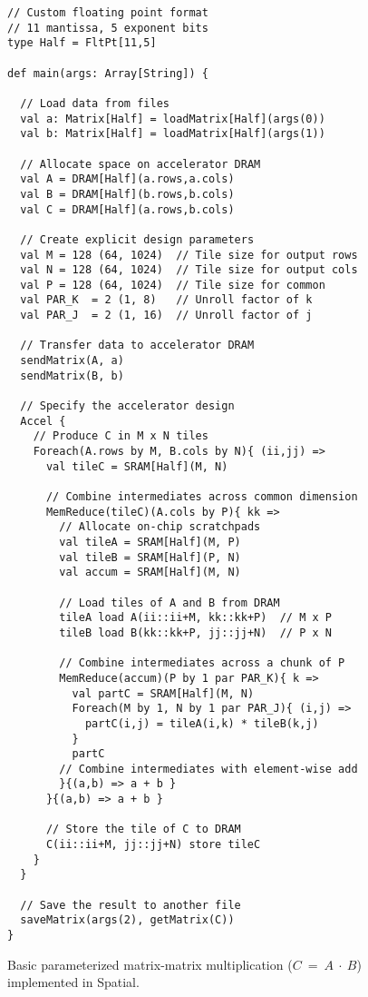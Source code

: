 \begin{figure}
\centering

\newsavebox{\gemm}
\begin{lrbox}{\gemm}
\begin{lstlisting}[language=Spatial,linewidth=0.88\columnwidth]
// Custom floating point format
// 11 mantissa, 5 exponent bits
type Half = FltPt[11,5]

def main(args: Array[String]) {

  // Load data from files
  val a: Matrix[Half] = loadMatrix[Half](args(0))
  val b: Matrix[Half] = loadMatrix[Half](args(1))

  // Allocate space on accelerator DRAM
  val A = DRAM[Half](a.rows,a.cols)
  val B = DRAM[Half](b.rows,b.cols)
  val C = DRAM[Half](a.rows,b.cols)

  // Create explicit design parameters
  val M = 128 (64, 1024)  // Tile size for output rows
  val N = 128 (64, 1024)  // Tile size for output cols
  val P = 128 (64, 1024)  // Tile size for common
  val PAR_K  = 2 (1, 8)   // Unroll factor of k
  val PAR_J  = 2 (1, 16)  // Unroll factor of j

  // Transfer data to accelerator DRAM
  sendMatrix(A, a)
  sendMatrix(B, b)

  // Specify the accelerator design
  Accel {
    // Produce C in M x N tiles
    Foreach(A.rows by M, B.cols by N){ (ii,jj) =>
      val tileC = SRAM[Half](M, N)

      // Combine intermediates across common dimension
      MemReduce(tileC)(A.cols by P){ kk =>
        // Allocate on-chip scratchpads
        val tileA = SRAM[Half](M, P)
        val tileB = SRAM[Half](P, N)
        val accum = SRAM[Half](M, N)

        // Load tiles of A and B from DRAM
        tileA load A(ii::ii+M, kk::kk+P)  // M x P
        tileB load B(kk::kk+P, jj::jj+N)  // P x N

        // Combine intermediates across a chunk of P
        MemReduce(accum)(P by 1 par PAR_K){ k =>
          val partC = SRAM[Half](M, N)
          Foreach(M by 1, N by 1 par PAR_J){ (i,j) =>
            partC(i,j) = tileA(i,k) * tileB(k,j)
          }
          partC
        // Combine intermediates with element-wise add
        }{(a,b) => a + b }
      }{(a,b) => a + b }

      // Store the tile of C to DRAM
      C(ii::ii+M, jj::jj+N) store tileC
    }
  }

  // Save the result to another file
  saveMatrix(args(2), getMatrix(C))
}
\end{lstlisting}
\end{lrbox}

\hspace{-15pt}\usebox{\gemm}
\caption{Basic parameterized matrix-matrix multiplication ($C$~=~$A~\cdot~B$) implemented in Spatial.}
\label{fig:matmult}
\end{figure}
